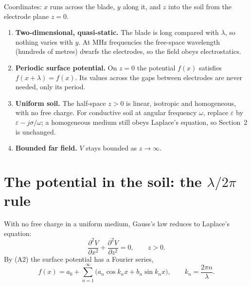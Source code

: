 \documentclass[11pt,letterpaper]{article}
\begin{document}
Coordinates: $x$ runs across the blade, $y$ along it, and $z$ into the soil from the electrode plane
$z = 0$.

\begin{enumerate}[label=(A\arabic*),leftmargin=3.2em]
  \item \textbf{Two-dimensional, quasi-static.} The blade is long compared with $\lambda$, so nothing
        varies with $y$. At MHz frequencies the free-space wavelength (hundreds of metres) dwarfs the
        electrodes, so the field obeys electrostatics.
  \item \textbf{Periodic surface potential.} On $z = 0$ the potential $f(x)$ satisfies
        $f(x+\lambda) = f(x)$. Its values across the gaps between electrodes are never needed, only its
        period.
  \item \textbf{Uniform soil.} The half-space $z > 0$ is linear, isotropic and homogeneous, with no free
        charge. For conductive soil at angular frequency $\omega$, replace $\varepsilon$ by
        $\varepsilon - j\sigma/\omega$; a homogeneous medium still obeys Laplace's equation, so
        Section~2 is unchanged.
  \item \textbf{Bounded far field.} $V$ stays bounded as $z \to \infty$.
\end{enumerate}

\section{The potential in the soil: the $\lambda/2\pi$ rule}

With no free charge in a uniform medium, Gauss's law reduces to Laplace's equation:
\begin{equation}
  \frac{\partial^2 V}{\partial x^2} + \frac{\partial^2 V}{\partial z^2} = 0, \qquad z > 0.
  \label{eq:laplace}
\end{equation}
By (A2) the surface potential has a Fourier series,
\begin{equation}
  f(x) = a_0 + \sum_{n=1}^{\infty} \bigl( a_n \cos k_n x + b_n \sin k_n x \bigr),
  \qquad k_n = \frac{2\pi n}{\lambda}.
  \label{eq:fourier}
\end{equation}
\end{document}
